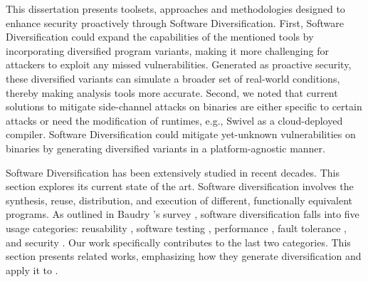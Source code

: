 

\label{sota:sw}



This dissertation presents toolsets, approaches and methodologies designed to enhance \Wasm security proactively through Software Diversification.
First, Software Diversification could expand the capabilities of the mentioned tools by incorporating diversified program variants, making it more challenging for attackers to exploit any missed vulnerabilities.
Generated as proactive security, these diversified variants can simulate a broader set of real-world conditions, thereby making \Wasm analysis tools more accurate. 
Second, we noted that current solutions to mitigate side-channel attacks on \Wasm binaries are either specific to certain attacks or need the modification of runtimes, e.g., Swivel as a cloud-deployed compiler.
Software Diversification could mitigate yet-unknown vulnerabilities on \Wasm binaries by generating diversified variants in a platform-agnostic manner.


Software Diversification has been extensively studied in recent decades. 
This section explores its current state of the art. 
Software diversification involves the synthesis, reuse, distribution, and execution of different, functionally equivalent programs. 
As outlined in Baudry \etal's survey \cite{natural_diversity}, software diversification falls into five usage categories: reusability \cite{pohl2005software}, software testing \cite{Chen2010AdaptiveRT}, performance \cite{10.1145/2025113.2025133}, fault tolerance \cite{1659219}, and security \cite{cohen1993operating}. 
Our work specifically contributes to the last two categories.
This section presents related works, emphasizing how they generate diversification and apply it to \Wasm.







